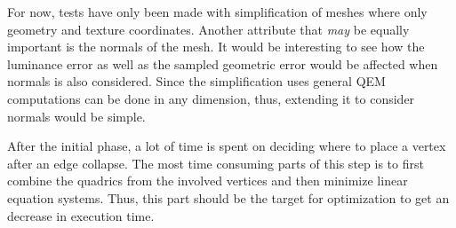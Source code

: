 For now, tests have only been made with simplification of meshes where only geometry and texture coordinates. Another attribute that \emph{may} be equally important is the normals of the mesh. It would be interesting to see how the luminance error as well as the sampled geometric error would be affected when normals is also considered. Since the simplification uses general QEM computations can be done in any dimension, thus, extending it to consider normals would be simple.

After the initial phase, a lot of time is spent on deciding where to place a vertex after an edge collapse. The most time consuming parts of this step is to first combine the quadrics from the involved vertices and then minimize linear equation systems. Thus, this part should be the target for optimization to get an decrease in execution time. 



